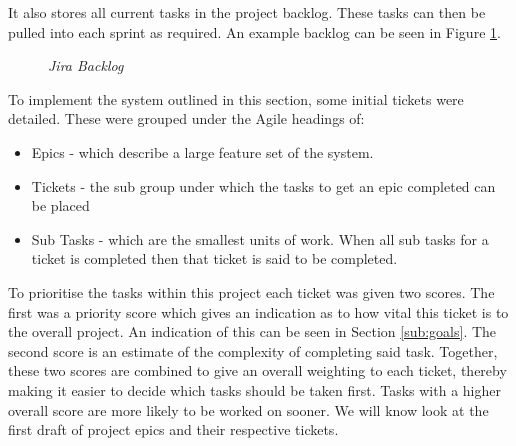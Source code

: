 It also stores all current tasks in the project backlog. These tasks can then be pulled into each sprint as required. An example backlog can be seen in Figure \ref{fig:backlog}.

\begin{figure}[!ht]
\centering
{}
\caption{\em Jira Backlog}
\label{fig:backlog}
\end{figure}

\newpage
To implement the system outlined in this section, some initial tickets were detailed. These were grouped under the Agile headings of:

\begin{itemize}
	\item Epics - which describe a large feature set of the system.
	\item Tickets - the sub group under which the tasks to get an epic completed can be placed
	\item Sub Tasks - which are the smallest units of work. When all sub tasks for a ticket is completed then that ticket is said to be completed.
\end{itemize}

To prioritise the tasks within this project each ticket was given two scores. The first was a priority score which gives an indication as to how vital this ticket is to the overall project. An indication of this can be seen in Section \ref{sub:goals}. The second score is an estimate of the complexity of completing said task. Together, these two scores are combined to give an overall weighting to each ticket, thereby making it easier to decide which tasks should be taken first. Tasks with a higher overall score are more likely to be worked on sooner. We will know look at the first draft of project epics and their respective tickets.

